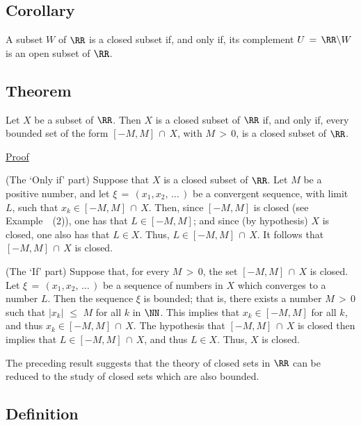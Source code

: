 {            \subsection{\small{\bf Corollary}}
            \label{CorC80.77}

        A subset $W$ of ${\RR}$ is a closed subset if, and only if, its complement $U \,=\, {\RR}{\setminus}W$ is an open subset of ${\RR}$.

\V
\V

            \subsection{\small{\bf Theorem}}
            \label{ThmC80.80}

        Let $X$ be a subset of ${\RR}$.
    Then $X$ is a closed subset of ${\RR}$ if, and only if, every bounded set of the form $[-M,M]\,{\cap}\,X$, with $M\,>\,0$,
    is a closed subset of ${\RR}$.

\V

        \underline{Proof}

        (The `Only if' part) Suppose that $X$ is a closed subset of ${\RR}$. Let $M$ be a positive number, and let ${\xi} \,=\, (x_{1},x_{2},\,{\ldots}\,)$ be a convergent sequence, with limit $L$,
    such that $x_{k}{\in}[-M,M]\,{\cap}\,X$.
    Then, since $[-M,M]$ is closed (see Example~~(2)), one has that $L{\in}[-M,M]$;
    and since (by hypothesis) $X$ is closed, one also has that $L{\in}X$.
    Thus, $L{\in}[-M,M]\,{\cap}\,X$.
    It follows that $[-M,M]\,{\cap}\,X$ is closed.

        (The `If' part) Suppose that, for every $M\,>\,0$, the set $[-M,M]\,{\cap}\,X$ is closed.
    Let ${\xi} \,=\, (x_{1},x_{2},\,{\ldots}\,)$ be a sequence of numbers in $X$ which converges to a number $L$.
    Then the sequence ${\xi}$ is bounded; that is, there exists a number $M\,>\,0$ such that $|x_{k}|\,\,{\leq}\,\,M$ for all $k$ in ${\NN}$.
    This implies that $x_{k}{\in}[-M,M]$ for all $k$, and thus $x_{k}{\in}[-M,M]\,{\cap}\,X$.
    The hypothesis that $[-M,M]\,{\cap}\,X$ is closed then implies that $L{\in}[-M,M]\,{\cap}\,X$, and thus $L{\in}X$.
    Thus, $X$ is closed.

\V
\V

        The preceding result suggests that the theory of closed sets in ${\RR}$ can be reduced  to the study of closed sets which are also bounded.

\V

            \subsection{\small{\bf Definition}}
            \label{DefC80.90}

}
